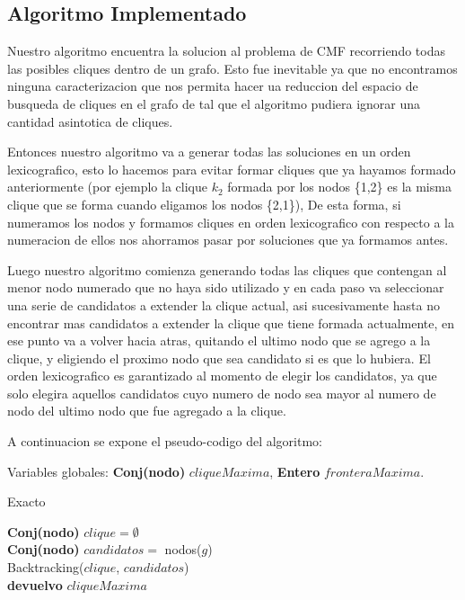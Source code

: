 \subsection{Algoritmo Implementado}

Nuestro algoritmo encuentra la solucion al problema de CMF recorriendo todas las posibles cliques dentro de un grafo. Esto fue inevitable ya que no encontramos ninguna caracterizacion que nos permita hacer ua reduccion del espacio de busqueda de cliques en el grafo de tal que el algoritmo pudiera ignorar una cantidad asintotica de cliques.

Entonces nuestro algoritmo va a generar todas las soluciones en un orden lexicografico, esto lo hacemos para evitar formar cliques que ya hayamos formado anteriormente (por ejemplo la clique $k_{2}$ formada por los nodos \{1,2\} es la misma clique que se forma cuando eligamos los nodos \{2,1\}), De esta forma, si numeramos los nodos y formamos cliques en orden lexicografico con respecto a la numeracion de ellos nos ahorramos pasar por soluciones que ya formamos antes.

Luego nuestro algoritmo comienza generando todas las cliques que contengan al menor nodo numerado que no haya sido utilizado y en cada paso va seleccionar una serie de candidatos a extender la clique actual, asi sucesivamente hasta no encontrar mas candidatos a extender la clique que tiene formada actualmente, en ese punto va a volver hacia atras, quitando el ultimo nodo que se agrego a la clique, y eligiendo el proximo nodo que sea candidato si es que lo hubiera. El orden lexicografico es garantizado al momento de elegir los candidatos, ya que solo elegira aquellos candidatos cuyo numero de nodo sea mayor al numero de nodo del ultimo nodo que fue agregado a la clique.

A continuacion se expone el pseudo-codigo del algoritmo:

Variables globales: \textbf{Conj(nodo)} $cliqueMaxima$, \textbf{Entero} $fronteraMaxima$.\\

\begin{algorithm}[H]
	\SetAlgoLined
	\caption{Exacto}

	\textbf{Conj(nodo)} $clique = \emptyset$\\
	\textbf{Conj(nodo)} $candidatos = $ nodos($g$)\\

	Backtracking($clique$, $candidatos$)\\

	\textbf{devuelvo} $cliqueMaxima$\\

\end{algorithm}

